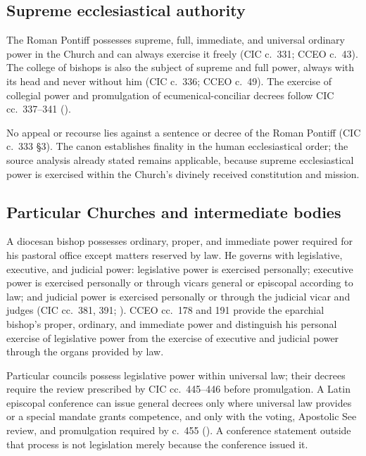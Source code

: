 \subsection{Supreme ecclesiastical authority}

The Roman Pontiff possesses supreme, full, immediate, and universal ordinary power in the Church and can always exercise it freely (CIC c.~331; CCEO c.~43). The college of bishops is also the subject of supreme and full power, always with its head and never without him (CIC c.~336; CCEO c.~49). The exercise of collegial power and promulgation of ecumenical-conciliar decrees follow CIC cc.~337--341 ().

No appeal or recourse lies against a sentence or decree of the Roman Pontiff (CIC c.~333 \S3). The canon establishes finality in the human ecclesiastical order; the source analysis already stated remains applicable, because supreme ecclesiastical power is exercised within the Church's divinely received constitution and mission.

\subsection{Particular Churches and intermediate bodies}

A diocesan bishop possesses ordinary, proper, and immediate power required for his pastoral office except matters reserved by law. He governs with legislative, executive, and judicial power: legislative power is exercised personally; executive power is exercised personally or through vicars general or episcopal according to law; and judicial power is exercised personally or through the judicial vicar and judges (CIC cc.~381, 391; ). CCEO cc.~178 and 191 provide the eparchial bishop's proper, ordinary, and immediate power and distinguish his personal exercise of legislative power from the exercise of executive and judicial power through the organs provided by law.

Particular councils possess legislative power within universal law; their decrees require the review prescribed by CIC cc.~445--446 before promulgation. A Latin episcopal conference can issue general decrees only where universal law provides or a special mandate grants competence, and only with the voting, Apostolic See review, and promulgation required by c.~455 (). A conference statement outside that process is not legislation merely because the conference issued it.

